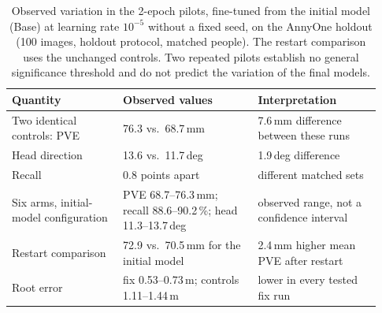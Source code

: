 \begin{table}[!htb]
\centering\footnotesize
\begin{tabular}{@{}p{0.28\linewidth}p{0.34\linewidth}p{0.31\linewidth}@{}}
\toprule
Quantity & Observed values & Interpretation \\
\midrule
Two identical controls: PVE & 76.3 vs.\ 68.7\,mm & 7.6\,mm difference between these runs \\
\quad Head direction & 13.6 vs.\ 11.7\,deg & 1.9\,deg difference \\
\quad Recall & 0.8 points apart & different matched sets \\
Six arms, initial-model configuration & PVE 68.7--76.3\,mm; recall 88.6--90.2\,\%; head 11.3--13.7\,deg & observed range, not a confidence interval \\
Restart comparison & 72.9 vs.\ 70.5\,mm for the initial model & 2.4\,mm higher mean PVE after restart \\
Root error & fix 0.53--0.73\,m; controls 1.11--1.44\,m & lower in every tested fix run \\
\bottomrule
\end{tabular}
\caption[Pilot variation and restart comparison]{Observed variation in the 2-epoch pilots, fine-tuned from the
initial model (Base) at learning rate $10^{-5}$ without a fixed seed, on the AnnyOne holdout (100 images, holdout
protocol, matched people). The restart comparison uses the unchanged controls. Two repeated pilots establish
no general significance threshold and do not predict the variation of the final models.}
\label{tab:pilot-noise}
\end{table}
